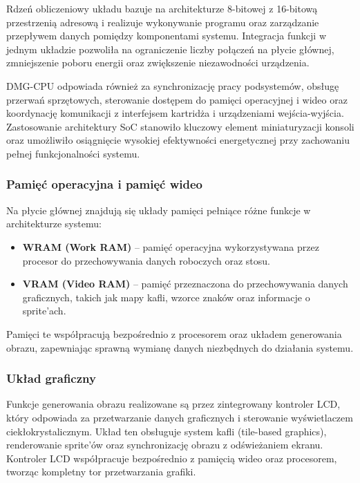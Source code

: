 \documentclass{article}
\begin{document}
Rdzeń obliczeniowy układu bazuje na architekturze 8-bitowej z 16-bitową przestrzenią adresową i realizuje wykonywanie programu oraz zarządzanie przepływem danych pomiędzy komponentami systemu. Integracja funkcji w jednym układzie pozwoliła na ograniczenie liczby połączeń na płycie głównej, zmniejszenie poboru energii oraz zwiększenie niezawodności urządzenia.

DMG-CPU odpowiada również za synchronizację pracy podsystemów, obsługę przerwań sprzętowych, sterowanie dostępem do pamięci operacyjnej i wideo oraz koordynację komunikacji z interfejsem kartridża i urządzeniami wejścia-wyjścia. Zastosowanie architektury SoC stanowiło kluczowy element miniaturyzacji konsoli oraz umożliwiło osiągnięcie wysokiej efektywności energetycznej przy zachowaniu pełnej funkcjonalności systemu.


\subsubsection{Pamięć operacyjna i pamięć wideo}

Na płycie głównej znajdują się układy pamięci pełniące różne funkcje w architekturze systemu:

\begin{itemize}
	\item \textbf{WRAM (Work RAM)} -- pamięć operacyjna wykorzystywana przez procesor do przechowywania danych roboczych oraz stosu.
	\item \textbf{VRAM (Video RAM)} -- pamięć przeznaczona do przechowywania danych graficznych, takich jak mapy kafli, wzorce znaków oraz informacje o sprite’ach.
\end{itemize}

Pamięci te współpracują bezpośrednio z procesorem oraz układem generowania obrazu, zapewniając sprawną wymianę danych niezbędnych do działania systemu.

\subsubsection{Układ graficzny}

Funkcje generowania obrazu realizowane są przez zintegrowany kontroler LCD, który odpowiada za przetwarzanie danych graficznych i sterowanie wyświetlaczem ciekłokrystalicznym. Układ ten obsługuje system kafli (tile-based graphics), renderowanie sprite’ów oraz synchronizację obrazu z odświeżaniem ekranu. Kontroler LCD współpracuje bezpośrednio z pamięcią wideo oraz procesorem, tworząc kompletny tor przetwarzania grafiki.
\end{document}
